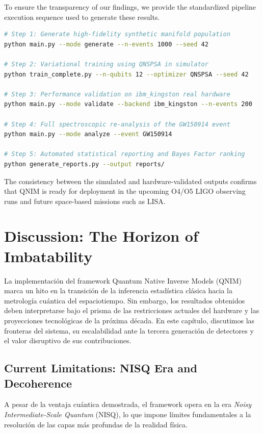 \documentclass[11pt,a4paper,spanish]{book}
\numberwithin{equation}{chapter}
\numberwithin{figure}{chapter}
\numberwithin{equation}{chapter}
\numberwithin{figure}{chapter}
\numberwithin{table}{chapter}
\begin{document}
To ensure the transparency of our findings, we provide the standardized pipeline execution sequence used to generate these results.

\begin{lstlisting}[language=bash, caption={QNIM Reproducibility Workflow}]
# Step 1: Generate high-fidelity synthetic manifold population
python main.py --mode generate --n-events 1000 --seed 42

# Step 2: Variational training using QNSPSA in simulator
python train_complete.py --n-qubits 12 --optimizer QNSPSA --seed 42

# Step 3: Performance validation on ibm_kingston real hardware
python main.py --mode validate --backend ibm_kingston --n-events 200

# Step 4: Full spectroscopic re-analysis of the GW150914 event
python main.py --mode analyze --event GW150914

# Step 5: Automated statistical reporting and Bayes Factor ranking
python generate_reports.py --output reports/
\end{lstlisting}

The consistency between the simulated and hardware-validated outputs confirms that QNIM is ready for deployment in the upcoming O4/O5 LIGO observing runs and future space-based missions such as LISA.

\chapter{Discussion: The Horizon of Imbatability}
\label{chap:discussion}

La implementación del framework Quantum Native Inverse Models (QNIM) marca un hito en la transición de la inferencia estadística clásica hacia la metrología cuántica del espaciotiempo. Sin embargo, los resultados obtenidos deben interpretarse bajo el prisma de las restricciones actuales del hardware y las proyecciones tecnológicas de la próxima década. En este capítulo, discutimos las fronteras del sistema, su escalabilidad ante la tercera generación de detectores y el valor disruptivo de sus contribuciones.

\section{Current Limitations: NISQ Era and Decoherence}

A pesar de la ventaja cuántica demostrada, el framework opera en la era \textit{Noisy Intermediate-Scale Quantum} (NISQ), lo que impone límites fundamentales a la resolución de las capas más profundas de la realidad física.
\end{document}
